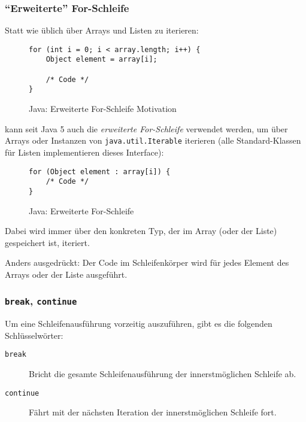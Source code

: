 	\subsubsection{\enquote{Erweiterte} For-Schleife}
		Statt wie üblich über Arrays und Listen zu iterieren:
		\begin{figure}[H]
			\centering
			\begin{lstlisting}
for (int i = 0; i < array.length; i++) {
	Object element = array[i];

	/* Code */
}
			\end{lstlisting}
			\caption{Java: Erweiterte For-Schleife Motivation}
		\end{figure}
		kann seit Java 5 auch die \textit{erweiterte For-Schleife} verwendet werden, um über Arrays oder Instanzen von \texttt{java.util.Iterable} iterieren (alle Standard-Klassen für Listen implementieren dieses Interface):
		\begin{figure}[H]
			\centering
			\begin{lstlisting}
for (Object element : array[i]) {
	/* Code */
}
			\end{lstlisting}
			\caption{Java: Erweiterte For-Schleife}
		\end{figure}
		Dabei wird immer über den konkreten Typ, der im Array (oder der Liste) gespeichert ist, iteriert.
		
		Anders ausgedrückt: Der Code im Schleifenkörper wird für jedes Element des Arrays oder der Liste ausgeführt.
	
	\subsubsection{\texttt{break}, \texttt{continue}}
		Um eine Schleifenausführung vorzeitig auszuführen, gibt es die folgenden Schlüsselwörter:
		\begin{description}
			\item[\texttt{break}] Bricht die gesamte Schleifenausführung der innerstmöglichen Schleife ab.
			\item[\texttt{continue}] Fährt mit der nächsten Iteration der innerstmöglichen Schleife fort.
		\end{description}
		
